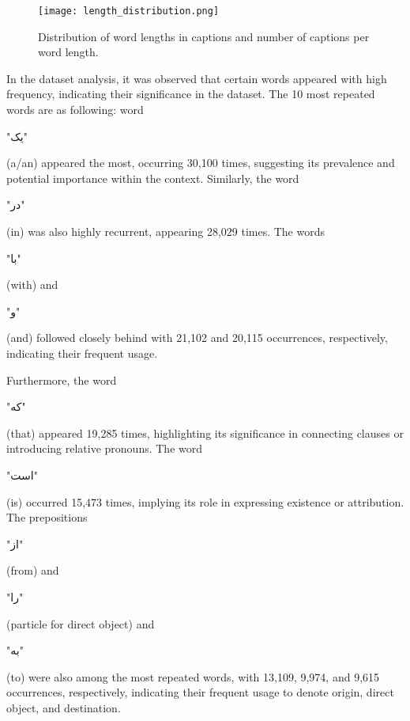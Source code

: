 \documentclass[runningheads]{llncs}
\begin{document}
\begin{figure}
  \begin{center}
    \texttt{[image: length\_distribution.png]}
    \caption{Distribution of word lengths in captions and number of captions per word length.}
    \label{fig3}
  \end{center}
\end{figure}

In the dataset analysis, it was observed that certain words appeared with high frequency, indicating their significance in the dataset. The 10 most repeated words are as following: word \begin{farsi} \arabicfont\small "یک"\end{farsi} (a/an) appeared the most, occurring 30,100 times, suggesting its prevalence and potential importance within the context. Similarly, the word \begin{farsi} \arabicfont\small "در"\end{farsi} (in) was also highly recurrent, appearing 28,029 times. The words \begin{farsi} \arabicfont\small "با"\end{farsi} (with) and \begin{farsi} \arabicfont\small "و"\end{farsi} (and) followed closely behind with 21,102 and 20,115 occurrences, respectively, indicating their frequent usage.

Furthermore, the word \begin{farsi} \arabicfont\small "که"\end{farsi} (that) appeared 19,285 times, highlighting its significance in connecting clauses or introducing relative pronouns. The word \begin{farsi} \arabicfont\small "است"\end{farsi} (is) occurred 15,473 times, implying its role in expressing existence or attribution. The prepositions\begin{farsi} \arabicfont\small "از"\end{farsi} (from) and \begin{farsi} \arabicfont\small "را"\end{farsi} (particle for direct object) and \begin{farsi} \arabicfont\small "به"\end{farsi} (to) were also among the most repeated words, with 13,109, 9,974, and 9,615 occurrences, respectively, indicating their frequent usage to denote origin, direct object, and destination.
\end{document}

